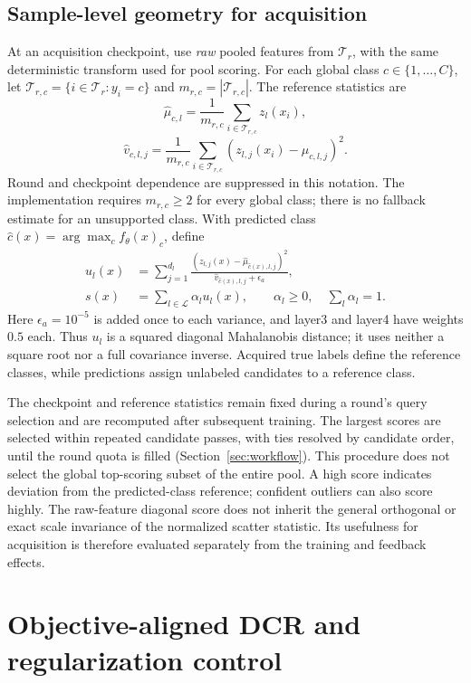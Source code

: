 \documentclass[10pt,a4paper,twocolumn]{article}
\begin{document}
\subsection{Sample-level geometry for acquisition}

At an acquisition checkpoint, use \emph{raw} pooled features from
$\mathcal T_r$, with the same deterministic transform used for pool
scoring. For each global class $c\in\{1,\ldots,C\}$, let
$\mathcal T_{r,c}=\{i\in\mathcal T_r:y_i=c\}$ and
$m_{r,c}=|\mathcal T_{r,c}|$. The reference statistics are
\[
 \widehat\mu_{c,l}=\frac1{m_{r,c}}
                   \sum_{i\in\mathcal T_{r,c}}z_l(x_i),
\]
\[
 \widehat v_{c,l,j}=\frac1{m_{r,c}}
 \sum_{i\in\mathcal T_{r,c}}
 (z_{l,j}(x_i)-\widehat\mu_{c,l,j})^2.
\]
Round and checkpoint dependence are suppressed in this notation.
The implementation requires $m_{r,c}\ge2$ for every global class;
there is no fallback estimate for an unsupported class.
With predicted class $\widehat c(x)=\arg\max_c f_\theta(x)_c$, define
\begin{align}
 u_l(x)&=\sum_{j=1}^{d_l}
 \frac{(z_{l,j}(x)-\widehat\mu_{\widehat c(x),l,j})^2}
 {\widehat v_{\widehat c(x),l,j}+\epsilon_a},\\
 s(x)&=\sum_{l\in\mathcal L}\alpha_l u_l(x),
 \qquad \alpha_l\ge0,\quad\sum_l\alpha_l=1.
 \label{eq:acquisition}
\end{align}
Here $\epsilon_a=10^{-5}$ is added once to each variance, and layer3
and layer4 have weights $0.5$ each. Thus $u_l$ is a squared diagonal
Mahalanobis distance; it uses neither a square root nor a full covariance
inverse. Acquired true labels define the reference classes, while
predictions assign unlabeled candidates to a reference class.

The checkpoint and reference statistics remain fixed during a round's
query selection and are recomputed after subsequent training. The largest
scores are selected within repeated candidate passes, with ties resolved
by candidate order, until the round quota is filled
(Section~\ref{sec:workflow}). This procedure does not select the global
top-scoring subset of the entire pool. A high score indicates deviation
from the predicted-class reference; confident outliers can also score
highly. The raw-feature diagonal score does not inherit the general
orthogonal or exact scale invariance of the normalized scatter statistic.
Its usefulness for acquisition is therefore evaluated separately from
the training and feedback effects.

\section{Objective-aligned DCR and regularization control}
\label{sec:framework}
\end{document}
